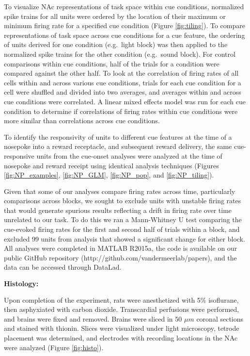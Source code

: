 \documentclass[11pt]{article}
\begin{document}
{To visualize NAc representations of task space within cue conditions,
normalized spike trains for all units were ordered by the location of
their maximum or minimum firing rate for a specified cue condition
(Figure \ref{fig:tiling}). To compare representations of task space
across cue conditions for a cue feature, the ordering of units derived
for one condition (e.g.\ light block) was then applied to the
normalized spike trains for the other condition (e.g.\ sound
block). For control comparisons within cue conditions, half of the
trials for a condition were compared against the other half. To look
at the correlation of firing rates of all cells within and across
various cue conditions, trials for each cue condition for a cell were
shuffled and divided into two averages, and averages within and across
cue conditions were correlated. A linear mixed effects model was run
for each cue condition to determine if correlations of firing rates
within cue conditions were more similar than correlations across cue
conditions.

To identify the responsivity of units to different cue features at the
time of a nosepoke into a reward receptacle, and subsequent reward
delivery, the same cue-responsive units from the cue-onset analyses
were analyzed at the time of nosepoke and reward receipt using
identical analysis techniques (Figures \ref{fig:NP_examples},
\ref{fig:NP_GLM}, \ref{fig:NP_pop}, and \ref{fig:NP_tiling}).

Given that some of our analyses compare firing rates across time,
particularly comparisons across blocks, we sought to exclude units
with unstable firing rates that would generate spurious results
reflecting a drift in firing rate over time unrelated to our task. To
do this we ran a Mann-Whitney U test comparing the cue-evoked firing
rates for the first and second half of trials within a block, and
excluded 99 units from analysis that showed a significant change for
either block. All analyses were completed in MATLAB R2015a, the code
is available on our public GitHub repository
(http://github.com/vandermeerlab/papers), and the data can be accessed
through DataLad.

{\bf Histology:}

Upon completion of the experiment, rats were anesthetized with 5\%
isoflurane, then asphyxiated with carbon dioxide. Transcardial
perfusions were performed, and brains were fixed and removed. Brains
were sliced in 50 $\mu m$ coronal sections and stained with
thionin. Slices were visualized under light microscopy, tetrode
placement was determined, and electrodes with recording locations in
the NAc were analyzed (Figure \ref{fig:histo}).

}
\end{document}
